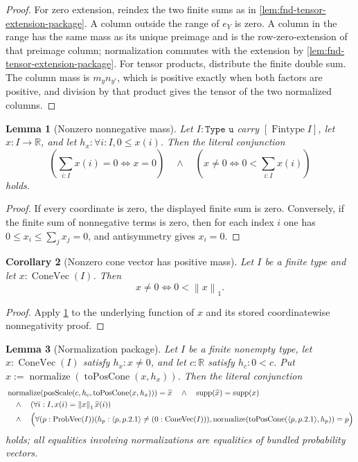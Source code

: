 \documentclass[9pt]{extarticle}
\newtheorem{lemma}{Lemma}[section]
\newtheorem{corollary}[lemma]{Corollary}
\theoremstyle{definition}
\theoremstyle{remark}
\newcommand{\R}{\mathbb R}
\newcommand{\supp}{\operatorname{supp}}
\newcommand{\norm}[1]{\left\lVert #1\right\rVert}
\begin{document}
\begin{proof}
For zero extension, reindex the two finite sums as in
\cref{lem:fnd-tensor-extension-package}.  A column outside the range of
$e_Y$ is zero.  A column in the range has the same mass as its unique
preimage and is the row-zero-extension of that preimage column; normalization
commutes with the extension by
\cref{lem:fnd-tensor-extension-package}.  For tensor products, distribute the
finite double sum.  The column mass is $m_yn_{y'}$, which is positive exactly
when both factors are positive, and division by that product gives the tensor
of the two normalized columns.
\end{proof}

\begin{lemma}[Nonzero nonnegative mass]
\label{lem:fnd-nonzero-mass}
Let $I:\texttt{Type u}$ carry $[\operatorname{Fintype}I]$, let
$x:I\to\R$, and let $h_x:\forall i:I,0\leq x(i)$.  Then the literal
conjunction
\[
 \left(\sum_{i:I}x(i)=0\Longleftrightarrow x=0\right)
 \quad\wedge\quad
 \left(x\neq0\Longleftrightarrow0<\sum_{i:I}x(i)\right)
\]
holds.
\end{lemma}

\begin{proof}
If every coordinate is zero, the displayed finite sum is zero.  Conversely,
if the finite sum of nonnegative terms is zero, then for each index $i$ one
has $0\leq x_i\leq\sum_jx_j=0$, and antisymmetry gives $x_i=0$.
\end{proof}

\begin{corollary}[Nonzero cone vector has positive mass]
\label{cor:fnd-cone-nonzero-mass}
Let $I$ be a finite type and let $x:\operatorname{ConeVec}(I)$.  Then
\[
 x\neq0\Longleftrightarrow0<\norm{x}_1.
\]
\end{corollary}

\begin{proof}
Apply \cref{lem:fnd-nonzero-mass} to the underlying function of $x$ and its
stored coordinatewise nonnegativity proof.
\end{proof}

\begin{lemma}[Normalization package]
\label{lem:fnd-normalization-package}
Let $I$ be a finite nonempty type, let $x:\operatorname{ConeVec}(I)$ satisfy
$h_x:x\neq0$, and let $c:\R$ satisfy $h_c:0<c$.  Put
$\widehat x:=\operatorname{normalize}(\operatorname{toPosCone}(x,h_x))$.
Then the literal conjunction
\begin{align*}
 &
 \operatorname{normalize}(\operatorname{posScale}(c,h_c,
 \operatorname{toPosCone}(x,h_x)))=\widehat x
 \quad\wedge\quad
 \supp(\widehat x)=\supp(x)\\
 &\quad\wedge\quad
 (\forall i:I,x(i)=\norm{x}_1\widehat x(i))\\
 &\quad\wedge\quad
 \Bigl(\forall(p:\operatorname{ProbVec}(I))
  (h_p:\langle p,p.2.1\rangle\neq(0:\operatorname{ConeVec}(I))),
 \operatorname{normalize}
   (\operatorname{toPosCone}(\langle p,p.2.1\rangle,h_p))=p
 \Bigr)
\end{align*}
holds; all equalities involving normalizations are equalities of bundled
probability vectors.
\end{lemma}
\end{document}
